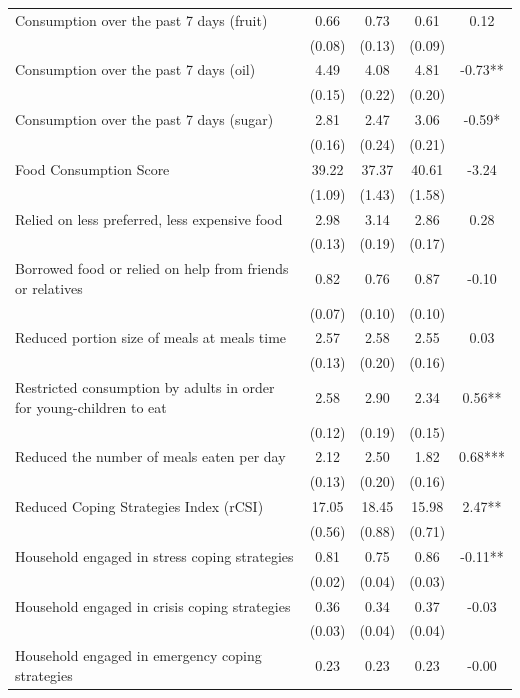 \begin{tabular}{@{\extracolsep{5pt}}lcccc}
Consumption over the past 7 days (fruit)   & 0.66    & 0.73    & 0.61    & 0.12   \\
 & (0.08)  & (0.13)  & (0.09)  &  \\ [1ex]
Consumption over the past 7 days (oil)   & 4.49    & 4.08    & 4.81    & -0.73**   \\
 & (0.15)  & (0.22)  & (0.20)  &  \\ [1ex]
Consumption over the past 7 days (sugar)   & 2.81    & 2.47    & 3.06    & -0.59*   \\
 & (0.16)  & (0.24)  & (0.21)  &  \\ [1ex]
Food Consumption Score   & 39.22    & 37.37    & 40.61    & -3.24   \\
 & (1.09)  & (1.43)  & (1.58)  &  \\ [1ex]
Relied on less preferred, less expensive food   & 2.98    & 3.14    & 2.86    & 0.28   \\
 & (0.13)  & (0.19)  & (0.17)  &  \\ [1ex]
Borrowed food or relied on help from friends or relatives   & 0.82    & 0.76    & 0.87    & -0.10   \\
 & (0.07)  & (0.10)  & (0.10)  &  \\ [1ex]
Reduced portion size of meals at meals time   & 2.57    & 2.58    & 2.55    & 0.03   \\
 & (0.13)  & (0.20)  & (0.16)  &  \\ [1ex]
Restricted consumption by adults in order for young-children to eat   & 2.58    & 2.90    & 2.34    & 0.56**   \\
 & (0.12)  & (0.19)  & (0.15)  &  \\ [1ex]
Reduced the number of meals eaten per day   & 2.12    & 2.50    & 1.82    & 0.68***   \\
 & (0.13)  & (0.20)  & (0.16)  &  \\ [1ex]
Reduced Coping Strategies Index (rCSI)   & 17.05    & 18.45    & 15.98    & 2.47**   \\
 & (0.56)  & (0.88)  & (0.71)  &  \\ [1ex]
Household engaged in stress coping strategies   & 0.81    & 0.75    & 0.86    & -0.11**   \\
 & (0.02)  & (0.04)  & (0.03)  &  \\ [1ex]
Household engaged in crisis coping strategies   & 0.36    & 0.34    & 0.37    & -0.03   \\
 & (0.03)  & (0.04)  & (0.04)  &  \\ [1ex]
Household engaged in emergency coping strategies   & 0.23    & 0.23    & 0.23    & -0.00   \\

\end{tabular}
